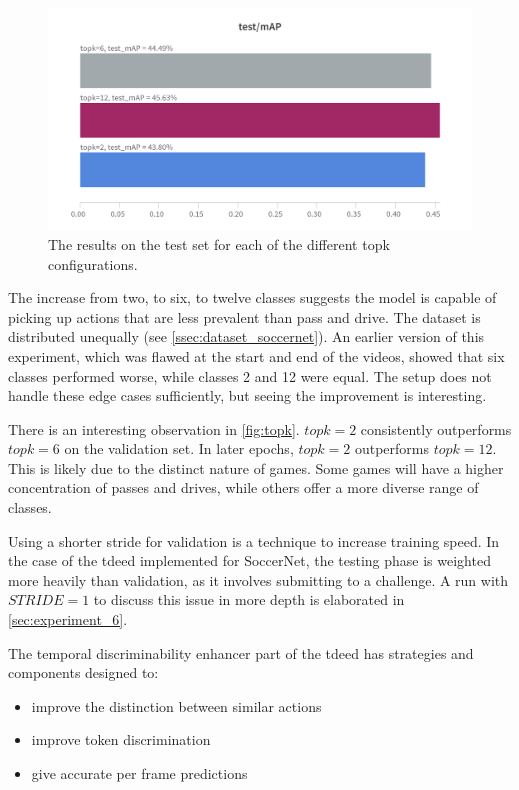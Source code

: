 \begin{figure}
    \centering
    \includegraphics[width=\linewidth]{figures/topk_test_map.png}
    \caption{The results on the test set for each of the different topk configurations. }
    \label{fig:topk_test_map}
\end{figure}

The increase from two, to six, to twelve classes suggests the model is capable of picking up actions that are less prevalent than pass and drive. The dataset is distributed unequally (see \cref{ssec:dataset_soccernet}). An earlier version of this experiment, which was flawed at the start and end of the videos, showed that six classes performed worse, while classes 2 and 12 were equal. The setup does not handle these edge cases sufficiently, but seeing the improvement is interesting. 

There is an interesting observation in \cref{fig:topk}. $topk=2$ consistently outperforms $topk=6$ on the validation set. In later epochs, $topk=2$ outperforms $topk=12$. This is likely due to the distinct nature of games. Some games will have a higher concentration of passes and drives, while others offer a more diverse range of classes.

Using a shorter stride for validation is a technique to increase training speed. In the case of the \acrshort{tdeed} implemented for SoccerNet, the testing phase is weighted more heavily than validation, as it involves submitting to a challenge. A run with \(STRIDE=1\) to discuss this issue in more depth is elaborated in \cref{sec:experiment_6}. 

The temporal discriminability enhancer part of the \acrlong{tdeed} has strategies and components designed to: 
\begin{itemize}
    \item improve the distinction between similar actions
    \item improve token discrimination
    \item give accurate per frame predictions
\end{itemize}

